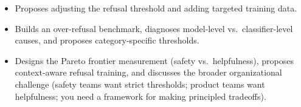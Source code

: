 \begin{interviewq}

\goodgreat
\begin{itemize}
    \item {} Proposes adjusting the refusal threshold and adding targeted training data.
    \item {} Builds an over-refusal benchmark, diagnoses model-level vs.\ classifier-level causes, and proposes category-specific thresholds.
    \item {} Designs the Pareto frontier measurement (safety vs.\ helpfulness), proposes context-aware refusal training, and discusses the broader organizational challenge (safety teams want strict thresholds; product teams want helpfulness; you need a framework for making principled tradeoffs).
\end{itemize}

\end{interviewq}


